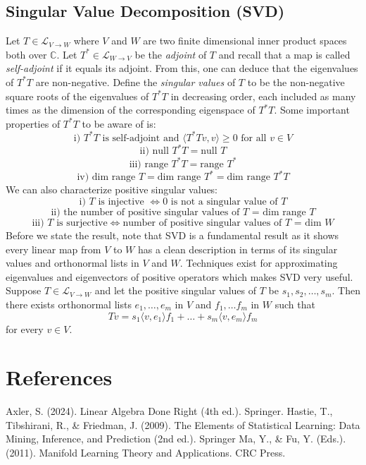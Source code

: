 \documentclass{article}
\begin{document}
\subsection{Singular Value Decomposition (SVD)}
Let $T \in \mathcal{L}_{V \to W}$ where $V$ and $W$ are two finite dimensional inner product spaces both over $\mathbb{C}$. Let $T^* \in \mathcal{L}_{W \to V}$ be the \emph{adjoint} of $T$ and recall that a map is called \emph{self-adjoint} 
if it equals its adjoint. From this, one can deduce that the eigenvalues of $T^*T$ are non-negative. \newline \newline 
Define the \emph{singular values} of $T$ to be the non-negative square roots of the eigenvalues of $T^*T$ in decreasing order, 
each included as many times as the dimension of the corresponding eigenspace of $T^*T$. Some important properties of $T^*T$ to be aware of is: 
$$
\text{i) }T^*T \text{ is self-adjoint and } \langle T^*Tv,v\rangle\geq 0 \text{ for all }v \in V
$$
$$
\text{ii) null } T^*T = \text{null } T
$$
$$
\text{iii) range }T^*T= \text{range }T^*
$$
$$
\text{iv) dim range }T = \text{dim range }T^* = \text{dim range }T^*T
$$
\newline \newline
We can also characterize positive singular values:
$$
\text{i) }T \text{ is injective } \iff \text{0 is not a singular value of }T
$$
$$
\text{ii) the number of positive singular values of $T$ = dim range }T  
$$
$$
\text{iii) }T \text{ is surjective} \iff \text{number of positive singular values of $T$ = dim }W
$$
\newline \newline
Before we state the result, note that SVD is a fundamental result as it shows every linear map from $V$ to $W$ has a clean description in terms of its singular values
and orthonormal lists in $V$ and $W$. Techniques exist for approximating eigenvalues and eigenvectors of positive operators which makes SVD very useful.
\newline \newline
Suppose $T \in \mathcal{L}_{V \to W}$ and let the positive singular values of $T$ be $s_1, s_2, \ldots, s_m$. Then there exists 
orthonormal lists $e_1, \ldots, e_m$ in $V$ and $f_1, \ldots f_m$ in $W$ such that 
$$
Tv = s_1\langle v,e_1\rangle f_1+ \ldots + s_m \langle v,e_m\rangle f_m
$$
for every $v \in V$.
\section{References}
Axler, S. (2024). Linear Algebra Done Right (4th ed.). Springer. \newline \newline
Hastie, T., Tibshirani, R., \& Friedman, J. (2009). The Elements of Statistical Learning: Data Mining, Inference, and Prediction (2nd ed.). Springer \newline \newline 
Ma, Y., \& Fu, Y. (Eds.). (2011). Manifold Learning Theory and Applications. CRC Press.
\end{document}
